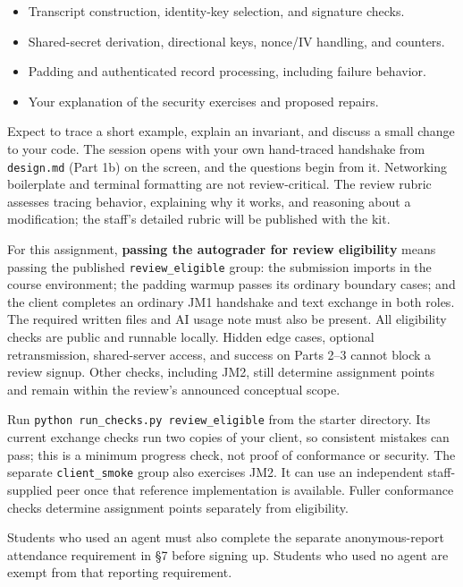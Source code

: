 \documentclass[11pt]{article}
\begin{document}
\begin{itemize}
\item Transcript construction, identity-key selection, and signature checks.
\item Shared-secret derivation, directional keys, nonce/IV handling, and counters.
\item Padding and authenticated record processing, including failure behavior.
\item Your explanation of the security exercises and proposed repairs.
\end{itemize}
Expect to trace a short example, explain an invariant, and discuss a small change to your code. The session opens with your own hand-traced handshake from \texttt{design.md} (Part 1b) on the screen, and the questions begin from it. Networking boilerplate and terminal formatting are not review-critical. The review rubric assesses tracing behavior, explaining why it works, and reasoning about a modification; the staff's detailed rubric will be published with the kit.

For this assignment, \textbf{passing the autograder for review eligibility} means passing the published \texttt{review\_eligible} group: the submission imports in the course environment; the padding warmup passes its ordinary boundary cases; and the client completes an ordinary JM1 handshake and text exchange in both roles. The required written files and AI usage note must also be present. All eligibility checks are public and runnable locally. Hidden edge cases, optional retransmission, shared-server access, and success on Parts 2--3 cannot block a review signup. Other checks, including JM2, still determine assignment points and remain within the review's announced conceptual scope.

Run \texttt{python run\_\allowbreak{}checks.\allowbreak{}py review\_\allowbreak{}eligible} from the starter directory. Its current exchange checks run two copies of your client, so consistent mistakes can pass; this is a minimum progress check, not proof of conformance or security. The separate \texttt{client\_smoke} group also exercises JM2. It can use an independent staff-supplied peer once that reference implementation is available. Fuller conformance checks determine assignment points separately from eligibility.

Students who used an agent must also complete the separate anonymous-report attendance requirement in \S{}7 before signing up. Students who used no agent are exempt from that reporting requirement.
\end{document}
